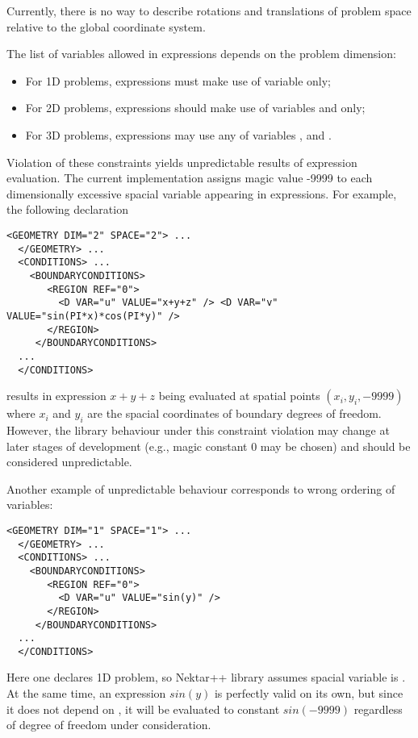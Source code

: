 Currently, there is no way to describe rotations and translations of problem
space relative to the global coordinate system.

The list of variables allowed in expressions depends on the problem
dimension:
\begin{itemize}
\item For 1D problems, expressions must make use of variable 
only;
\item For 2D problems, expressions should make use of variables 
and  only;
\item For 3D problems, expressions may use any of variables ,  and .
\end{itemize}

Violation of these constraints yields unpredictable results of expression
evaluation. The current implementation assigns magic value -9999 to each
dimensionally excessive spacial variable appearing in expressions. For
example, the following declaration 
\begin{lstlisting}[style=XMLStyle]
  <GEOMETRY DIM="2" SPACE="2"> ...
  </GEOMETRY> ...
  <CONDITIONS> ...
    <BOUNDARYCONDITIONS>
       <REGION REF="0">
         <D VAR="u" VALUE="x+y+z" /> <D VAR="v" VALUE="sin(PI*x)*cos(PI*y)" />
       </REGION>
     </BOUNDARYCONDITIONS>
  ...
  </CONDITIONS>
\end{lstlisting}
results in expression $x+y+z$ being evaluated at spatial points
$(x_i,y_i, -9999)$ where $x_i$ and $y_i$ are
the spacial coordinates of boundary degrees of freedom. However, the library
behaviour under this constraint violation may change at later stages of
development (e.g., magic constant 0 may be chosen) and should be considered
unpredictable.

Another example of unpredictable behaviour corresponds to wrong ordering of
variables:
\begin{lstlisting}[style=XMLStyle]
  <GEOMETRY DIM="1" SPACE="1"> ...
  </GEOMETRY> ...
  <CONDITIONS> ...
    <BOUNDARYCONDITIONS>
       <REGION REF="0">
         <D VAR="u" VALUE="sin(y)" />
       </REGION>
     </BOUNDARYCONDITIONS>
  ...
  </CONDITIONS>
\end{lstlisting}
Here one declares 1D problem, so Nektar++ library assumes spacial variable
is . At the same time, an expression $sin(y)$ is perfectly
valid on its own, but since it does not depend on , it will be evaluated
to constant $sin(-9999)$ regardless of degree of freedom under
consideration.


